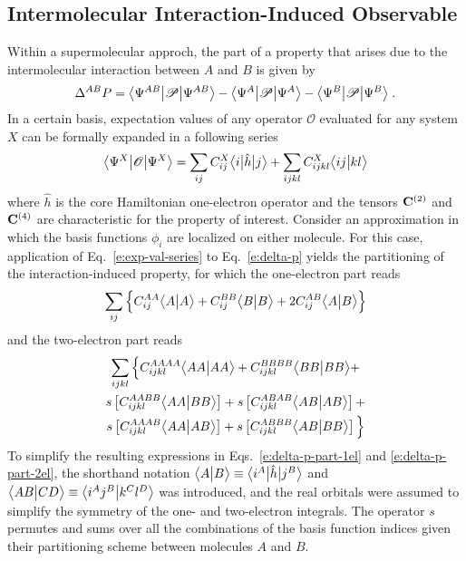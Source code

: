\subsection{\label{ss:2.1}Intermolecular Interaction-Induced Observable}

Within a supermolecular approch, the part of a property that arises due to the
intermolecular interaction between $A$ and $B$ is given by
%
\begin{equation} \label{e:delta-p}
	\Delta^{AB} P = \bigl\langle {\Psi^{AB}} \bigl\lvert {\mathscr{P}} \bigl\lvert {\Psi^{AB}} \bigr\rangle - 
	    \bigl\langle {\Psi^{A}} \bigl\lvert {\mathscr{P}} \bigl\lvert {\Psi^{A}} \bigr\rangle -
	    \bigl\langle {\Psi^{B}} \bigl\lvert {\mathscr{P}} \bigl\lvert {\Psi^{B}} \bigr\rangle\;.
\end{equation}
%
In a certain basis, expectation values of any operator $\mathscr{O}$ evaluated for
any system $X$ can be formally
expanded in a following series
%
\begin{equation} \label{e:exp-val-series}
	\bigl\langle {\Psi^{X}} \bigl\lvert {\mathscr{O}} \bigl\lvert {\Psi^{X}} \bigr\rangle =
	\sum_{ij} C^{X}_{ij} \bigl\langle {i} \bigl\lvert {\hat{h}} \bigl\lvert {j} \bigr\rangle
	+ \sum_{ijkl} C^{X}_{ijkl} \bigl\langle {ij} \bigl\lvert {kl} \bigr\rangle
\end{equation}
%
where $\hat{h}$ is the core Hamiltonian one\hyp{}electron operator
and the tensors
${\bf C}^{(2)}$ and ${\bf C}^{(4)}$ are characteristic for the property of interest.
Consider an approximation in which the basis functions $\phi_i$ 
are localized on either molecule. 
For this case, application of Eq.~\eqref{e:exp-val-series}
to Eq.~\eqref{e:delta-p} yields the partitioning of the interaction\hyp{}induced property,
for which the one\hyp{}electron part reads
%
\begin{equation} \label{e:delta-p-part-1el}
	\sum_{ij} \Big\{ 
	C^{AA}_{ij}  \BraKet{A}{A} + %
	C^{BB}_{ij}  \BraKet{B}{B} + %
2	C^{AB}_{ij}  \BraKet{A}{B}   %
	\Big\}
\end{equation}
%
and the two\hyp{}electron part reads
%
\begin{multline} \label{e:delta-p-part-2el}
	\sum_{ijkl} \Big\{  
	C^{AAAA}_{ijkl} \BraKet{AA}{AA} +    %
	C^{BBBB}_{ijkl} \BraKet{BB}{BB} + \\ %
	{s} \left[ C^{AABB}_{ijkl} \BraKet{AA}{BB} \right] + 
	{s} \left[ C^{ABAB}_{ijkl} \BraKet{AB}{AB} \right] + \\
	{s} \left[ C^{AAAB}_{ijkl} \BraKet{AA}{AB} \right] +
	{s} \left[ C^{ABBB}_{ijkl} \BraKet{AB}{BB} \right]
	\Big\}
\end{multline}
%
To simplify the resulting expressions
in Eqs.~\eqref{e:delta-p-part-1el} and \eqref{e:delta-p-part-2el},
the shorthand notation $\bigl\langle {A} \bigl\lvert {B} \bigr\rangle \equiv \bigl\langle {i^A} \bigl\lvert {\hat{h}} \bigl\lvert {j^B} \bigr\rangle$ and 
$\bigl\langle {AB} \bigl\lvert {CD} \bigr\rangle \equiv \bigl\langle {i^Aj^B} \bigl\lvert {k^Cl^D} \bigr\rangle$
was introduced, and
the real orbitals 
were assumed to simplify the symmetry of the one\hyp{} and two\hyp{}electron integrals.
The operator $s$ permutes and sums over all the combinations of the basis function indices
given their partitioning scheme between molecules $A$ and $B$.

